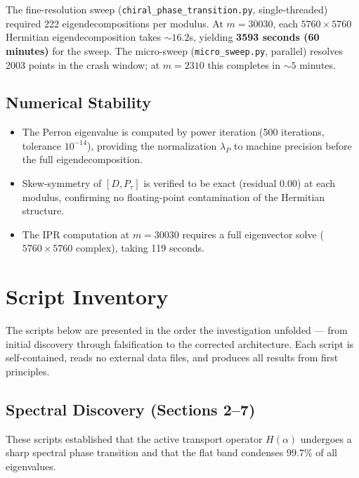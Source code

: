\documentclass[11pt,letterpaper]{article}
\theoremstyle{definition}
\theoremstyle{remark}
\begin{document}
The fine-resolution sweep (\texttt{chiral\_phase\_transition.py}, single-threaded) required 222 eigendecompositions per modulus. At $m = 30030$, each $5760 \times 5760$ Hermitian eigendecomposition takes $\sim 16.2$s, yielding \textbf{3593 seconds (60 minutes)} for the sweep. The micro-sweep (\texttt{micro\_sweep.py}, parallel) resolves 2003 points in the crash window; at $m = 2310$ this completes in $\sim 5$ minutes.

\subsection{Numerical Stability}\label{numerical-stability}

\begin{itemize}
\item
  The Perron eigenvalue is computed by power iteration (500 iterations, tolerance $10^{-14}$), providing the normalization $\lambda_P$ to machine precision before the full eigendecomposition.
\item
  Skew-symmetry of $[D, P_\tau]$ is verified to be exact (residual $0.00$) at each modulus, confirming no floating-point contamination of the Hermitian structure.
\item
  The IPR computation at $m = 30030$ requires a full eigenvector solve ($5760 \times 5760$ complex), taking 119 seconds.
\end{itemize}

\section{Script Inventory}\label{script-inventory}

The scripts below are presented in the order the investigation unfolded --- from initial discovery through falsification to the corrected architecture. Each script is self-contained, reads no external data files, and produces all results from first principles.

\subsection{Spectral Discovery (Sections 2--7)}\label{spectral-discovery-sections-27}

These scripts established that the active transport operator $H(\alpha)$ undergoes a sharp spectral phase transition and that the flat band condenses $99.7\%$ of all eigenvalues.
\end{document}
